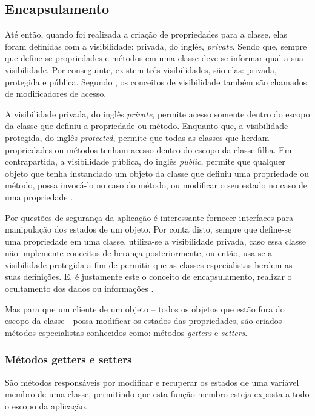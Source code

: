 \subsection{Encapsulamento}

Até então, quando foi realizada a criação de propriedades para a
classe, elas foram definidas com a visibilidade: privada, do inglês,
\textit{private}. Sendo que, sempre que define-se propriedades e métodos em
uma classe deve-se informar qual a  sua visibilidade. Por conseguinte, existem
três visibilidades, são elas: privada, protegida e pública. Segundo
, os conceitos de visibilidade também são
chamados de modificadores de acesso.

A visibilidade privada, do inglês \textit{private}, permite acesso somente
dentro do escopo da classe que definiu a propriedade ou método. Enquanto que, a
visibilidade protegida, do inglês \textit{protected}, permite que todas as
classes  que herdam propriedades ou métodos tenham acesso dentro do escopo da classe filha.
Em contrapartida, a visibilidade pública, do inglês \textit{public}, permite que
qualquer objeto que tenha instanciado um objeto da classe que definiu uma propriedade ou
método, possa invocá-lo no caso do método, ou modificar o seu estado no caso de
uma propriedade \cite{learningJava}.

Por questões de segurança da aplicação é interessante fornecer
interfaces para manipulação dos estados de um objeto. Por conta disto,  sempre
que define-se uma propriedade em uma classe, utiliza-se a visibilidade
privada, caso essa classe não implemente conceitos de herança posteriormente,
ou então, usa-se a visibilidade protegida a fim de permitir que as classes
especialistas  herdem as suas definições. E, é justamente este o conceito de
encapsulamento, realizar o ocultamento dos dados ou informações \cite{javaComoProgramar}.

Mas para que um cliente de um objeto – todos os objetos que estão fora do
escopo da classe - possa modificar os estados das propriedades, são criados
métodos especialistas conhecidos como: métodos \textit{getters} e \textit{setters}.

\subsubsection{Métodos getters e setters}

São métodos responsáveis por modificar e recuperar os estados de uma variável
membro de uma classe, permitindo que esta função membro esteja exposta a todo o
escopo da aplicação.

